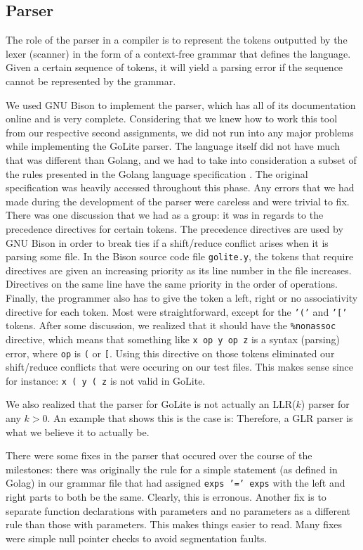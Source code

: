 \documentclass{article}
\begin{document}
\subsection{Parser}

The role of the parser in a compiler is to represent the tokens outputted by the lexer (scanner) in the form of a context-free grammar that defines the language. Given a certain sequence of tokens, it will yield a parsing error if the sequence cannot be represented by the grammar. 

We used GNU Bison to implement the parser, which has all of its documentation online and is very complete. Considering that we knew how to work this tool from our respective second assignments, we did not run into any major problems while implementing the GoLite parser. The language itself did not have much that was different than Golang, and we had to take into consideration a subset of the rules presented in the Golang language specification \cite{gospec}. The original specification was heavily accessed throughout this phase. Any errors that we had made during the development of the parser were careless and were trivial to fix. There was one discussion that we had as a group: it was in regards to the precedence directives for certain tokens. The precedence directives are used by GNU Bison in order to break ties if a shift/reduce conflict arises when it is parsing some file. In the Bison source code file \texttt{golite.y}, the tokens that require directives are given an increasing priority as its line number in the file increases. Directives on the same line have the same priority in the order of operations. Finally, the programmer also has to give the token a left, right or no associativity directive for each token. Most were straightforward, except for the \texttt{'('} and \texttt{'['} tokens. After some discussion, we realized that it should have the \verb|%nonassoc| directive, which means that something like \texttt{x op y op z} is a syntax (parsing) error, where \texttt{op} is \texttt{(} or \texttt{[}. Using this directive on those tokens eliminated our shift/reduce conflicts that were occuring on our test files. This makes sense since for instance: \texttt{x ( y ( z} is not valid in GoLite.

We also realized that the parser for GoLite is not actually an LLR($k$) parser for any $k>0$. An example that shows this is the case is:
Therefore, a GLR parser is what we believe it to actually be.

There were some fixes in the parser that occured over the course of the milestones: there was originally the rule for a simple statement (as defined in Golag) in our grammar file that had assigned \texttt{exps '=' exps} with the left and right parts to both be the same. Clearly, this is erronous. Another fix is to separate function declarations with parameters and no parameters as a different rule than those with parameters. This makes things easier to read. Many fixes were simple null pointer checks to avoid segmentation faults.
\end{document}
